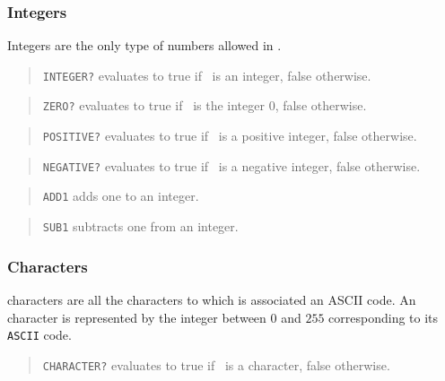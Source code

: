 \subsubsection{Integers}

Integers are the only type of numbers allowed in {\HG}.
\bigskip

\begin{quote}
	{\tt INTEGER?} evaluates to true if \obj\ is an integer, false otherwise.
\end{quote}

\begin{quote}
	{\tt ZERO?} evaluates  to true if \obj\ is the integer $0$, false otherwise.
\end{quote}

\begin{quote}
	{\tt POSITIVE?} evaluates to true if \obj\ is a positive integer, false
	otherwise.
\end{quote}

\begin{quote}
	{\tt NEGATIVE?} evaluates to true if \obj\ is a negative integer, false
	otherwise.
\end{quote}

\begin{quote}
	{\tt ADD1} adds one to an integer.
\end{quote}

\begin{quote}
	{\tt SUB1} subtracts one from an integer.
\end{quote}


\subsubsection{Characters}

{\HG} characters are all the characters to which is associated an ASCII code.
An {\HG} character is represented by the integer between $0$ and $255$
corresponding to its {\tt ASCII} code.

\bigskip

\begin{quote}
	{\tt CHARACTER?} evaluates  to true if \obj\ is a character, false otherwise.
\end{quote}

